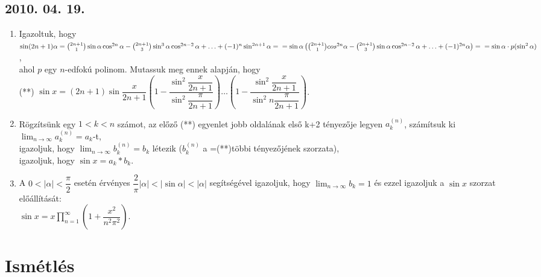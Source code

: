 \subsection*{2010. 04. 19.}
\begin{enumerate}
\item Igazoltuk, hogy \\
$\sin(2n+1)\alpha=\binom{2n+1}{1}\sin\alpha\cos^{2n}\alpha-\binom{2n+1}{3}\sin^3\alpha\cos^{2n-2}\alpha+\ldots+(-1)^n \sin^{2n+1}\alpha=\\=
\sin\alpha\left(\binom{2n+1}{1}cos^{2n}\alpha-\binom{2n+1}{3}\sin\alpha\cos^{2n-2}\alpha+\ldots+(-1)^{2n}\alpha\right)=\\=
\sin\alpha\cdot p (\sin^2\alpha)$, \\ahol $p$ egy $n$-edfokú polinom. Mutassuk meg ennek alapján, hogy\\ (**)
$\sin x=(2n+1)\sin \dfrac{x}{2n+1}\left(1-\dfrac{\sin^2\dfrac{x}{2n+1}}{\sin^2\dfrac{\pi}{2n+1}}\right)\ldots\left(1-\dfrac{\sin^2\dfrac{x}{2n+1}}{\sin^2 n \dfrac{\pi}{2n+1}}\right)$.
\item Rögzítsünk egy $1<k<n$ számot, az előző (**) egyenlet jobb oldalának első k+2 tényezője legyen $a_k^{(n)}$, számítsuk ki $\displaystyle\lim_{n \to \infty}a_k^{(n)}=a_k$-t,\\ 
igazoljuk, hogy $\displaystyle\lim_{n \to \infty} b_k^{(n)}=b_k$ létezik ($b_k^{(n)}$ a =(**)többi tényezőjének szorzata),\\ igazoljuk, hogy $\sin x =a_k*b_k$.
\item A $0<|\alpha|<\dfrac{\pi}{2}$ esetén érvényes $\dfrac{2}{\pi}|\alpha|<|\sin\alpha|<|\alpha|$ segítségével igazoljuk, hogy $\displaystyle\lim_{n \to \infty}b_k=1$ és ezzel igazoljuk a $\sin x$ szorzat előállítását:\\
$\sin x =x\displaystyle\prod_{n=1}^{\infty}\left(1+\dfrac{x^2}{n^2\pi^2}\right)$.

\end{enumerate}


\section{Ismétlés}

